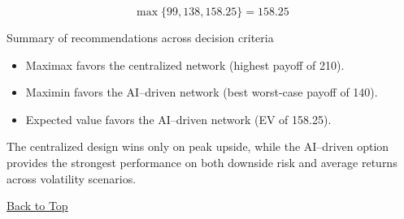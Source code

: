 \[
\max\{99, 138, 158.25\} = 158.25
\]

Summary of recommendations across decision criteria

\begin{itemize}
	\item Maximax favors the centralized network (highest payoff of 210).
	\item Maximin favors the AI--driven network (best worst-case payoff of 140).
	\item Expected value favors the AI--driven network (EV of 158.25).
\end{itemize}

The centralized design wins only on peak upside, while the AI--driven option provides the strongest performance on
both downside risk and average returns across volatility scenarios.

\vspace{6pt}
\noindent\hyperref[table-of-contents]{Back to Top}
